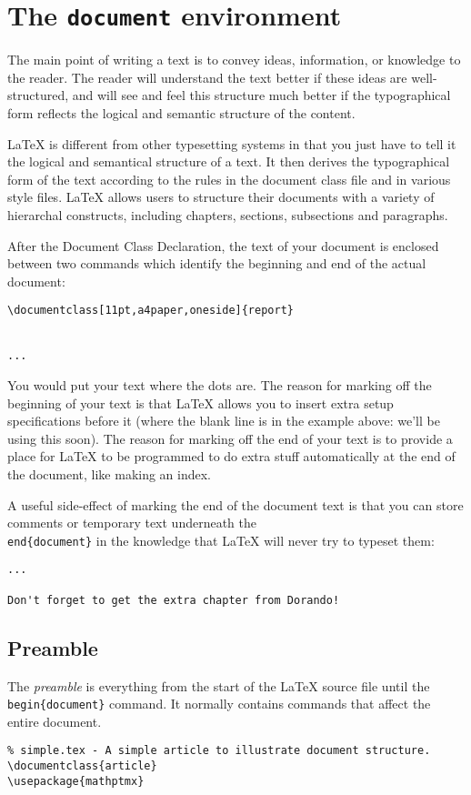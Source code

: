 \section{The \texttt{document} environment}
The main point of writing a text is to convey ideas, information, or knowledge
to the reader. The reader will understand the text better if these ideas are
well-structured, and will see and feel this structure much better if the
typographical form reflects the logical and semantic structure of the content.

LaTeX is different from other typesetting systems in that you just have to tell
it the logical and semantical structure of a text. It then derives the
typographical form of the text according to the rules in the document class
file and in various style files. LaTeX allows users to structure their
documents with a variety of hierarchal constructs, including chapters,
sections, subsections and paragraphs. 

After the Document Class Declaration, the text of your document is enclosed
between two commands which identify the beginning and end of the actual
document:
\begin{lstlisting}
\documentclass[11pt,a4paper,oneside]{report}


...

\end{lstlisting}


You would put your text where the dots are. The reason for marking off the
beginning of your text is that LaTeX allows you to insert extra setup
specifications before it (where the blank line is in the example above: we'll
be using this soon). The reason for marking off the end of your text is to
provide a place for LaTeX to be programmed to do extra stuff automatically at
the end of the document, like making an index.

A useful side-effect of marking the end of the document text is that you can
store comments or temporary text underneath the \texttt{\\end\{document\}} in the
knowledge that LaTeX will never try to typeset them:
\begin{lstlisting}
...

Don't forget to get the extra chapter from Dorando!
\end{lstlisting}

\subsection{ Preamble }
The \textit{preamble} is everything from the start of the LaTeX source file
until the \texttt{\\begin\{document\}} command. It normally contains commands
that affect the entire document.
\begin{lstlisting}
% simple.tex - A simple article to illustrate document structure.
\documentclass{article}
\usepackage{mathptmx}

\end{lstlisting}


